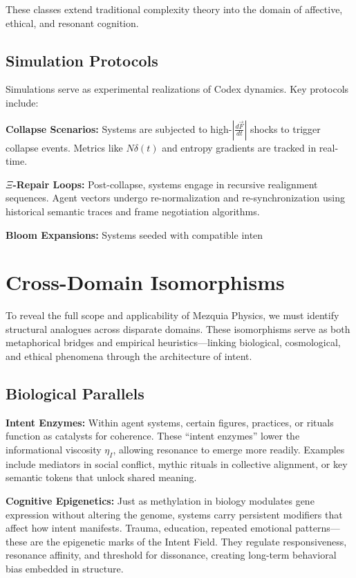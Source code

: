 \documentclass[12pt]{article}
\begin{document}
These classes extend traditional complexity theory into the domain of affective, ethical, and resonant cognition.

\subsection{Simulation Protocols}

Simulations serve as experimental realizations of Codex dynamics. Key protocols include:

\textbf{Collapse Scenarios:} Systems are subjected to high-\( \left| \frac{d\vec{F}}{dt} \right| \) shocks to trigger collapse events. Metrics like \(N\delta(t)\) and entropy gradients are tracked in real-time.

\textbf{\(\Xi\)-Repair Loops:} Post-collapse, systems engage in recursive realignment sequences. Agent vectors undergo re-normalization and re-synchronization using historical semantic traces and frame negotiation algorithms.

\textbf{Bloom Expansions:} Systems seeded with compatible inten

\section{Cross-Domain Isomorphisms}

To reveal the full scope and applicability of Mezquia Physics, we must identify structural analogues across disparate domains. These isomorphisms serve as both metaphorical bridges and empirical heuristics—linking biological, cosmological, and ethical phenomena through the architecture of intent.

\subsection{Biological Parallels}

\textbf{Intent Enzymes:} Within agent systems, certain figures, practices, or rituals function as catalysts for coherence. These “intent enzymes” lower the informational viscosity \(\eta_I\), allowing resonance to emerge more readily. Examples include mediators in social conflict, mythic rituals in collective alignment, or key semantic tokens that unlock shared meaning.

\textbf{Cognitive Epigenetics:} Just as methylation in biology modulates gene expression without altering the genome, systems carry persistent modifiers that affect how intent manifests. Trauma, education, repeated emotional patterns—these are the epigenetic marks of the Intent Field. They regulate responsiveness, resonance affinity, and threshold for dissonance, creating long-term behavioral bias embedded in structure.
\end{document}
